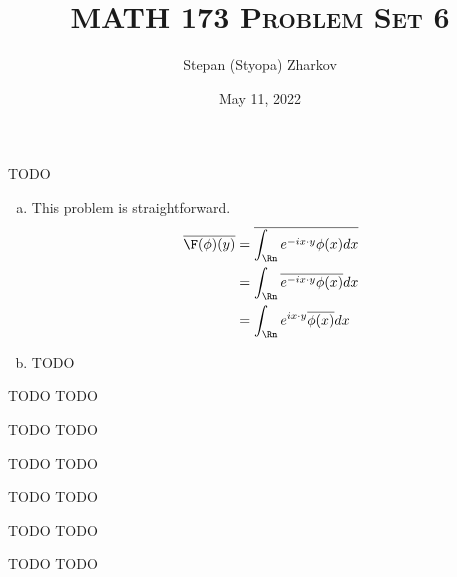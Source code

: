 \documentclass{article}
\title{\textsc{MATH 173 Problem Set 6}}
\author{Stepan (Styopa) Zharkov}
\date{May 11, 2022}
\begin{document}
\maketitle
{} TODO
 \tri
\hop 
\solution
\begin{enumerate}[(a)]
    \item This problem is straightforward. 
    \begin{align*}
        \ol{\F(\phi)(y)} &= \ol {\int_\Rn e^{-ix \cdot y}\phi(x)dx} \\
        &= \int_\Rn \ol {e^{-ix \cdot y}\phi(x)}dx \\
        &= \int_\Rn e^{ix \cdot y}\ol{\phi(x)}dx \\
    \end{align*}

    \item TODO
\end{enumerate}



\newpage
{} TODO
 \tri
\hop 
\solution
TODO 


\newpage
{} TODO
 \tri
\hop 
\solution
TODO 


\newpage
{} TODO
 \tri
\hop 
\solution
TODO 


\newpage
{} TODO
 \tri
\hop 
\solution
TODO 


\newpage
{} TODO
 \tri
\hop 
\solution
TODO 


\newpage
{} TODO
 \tri
\hop 
\solution
TODO 
\end{document}
